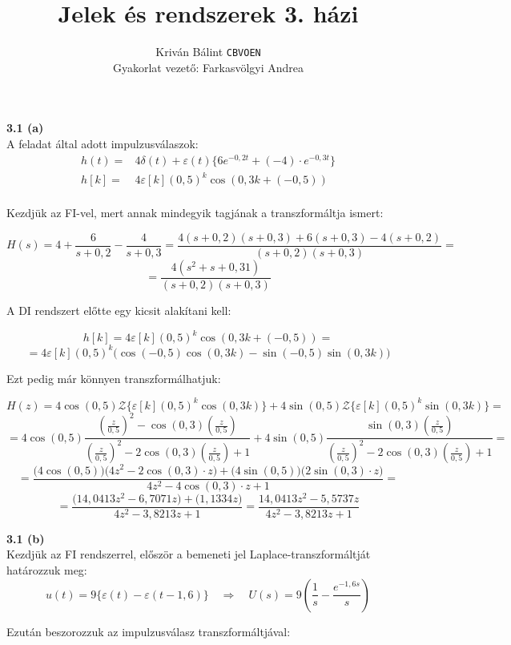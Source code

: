\documentclass[12pt,a4paper]{article}
\title{
\vspace{-2ex}
Jelek és rendszerek 3. házi}
\author{Kriván Bálint \texttt{CBVOEN}\\
Gyakorlat vezető: Farkasvölgyi Andrea}
\begin{document}
\maketitle

\thispagestyle{fancy}

\textbf{3.1 (a)}\\

A feladat által adott impulzusválaszok:
\begin{align*}
h(t) = {} & 4\delta(t) + \varepsilon(t)\{6e^{-0,2t}+(-4)\cdot e^{-0,3t}\} \\
h[k] = {} & 4\varepsilon[k](0,5)^{k}\cos(0,3k+(-0,5)) \\
\end{align*}

Kezdjük az FI-vel, mert annak mindegyik tagjának a transzformáltja ismert:

\[H(s) = 4 + \frac{6}{s+0,2} - \frac{4}{s+0,3} = \frac{4(s+0,2)(s+0,3)+6(s+0,3)-4(s+0,2)}{(s+0,2)(s+0,3)} = \]
\[= \boxed{\frac{4(s^2+s+0,31)}{(s+0,2)(s+0,3)}}\]

A DI rendszert előtte egy kicsit alakítani kell:

\[h[k] = 4\varepsilon[k](0,5)^{k}\cos(0,3k+(-0,5)) = \]
\[= 4\varepsilon[k](0,5)^{k}\Big(\cos(-0,5)\cos(0,3k) - \sin(-0,5)\sin(0,3k)\Big)\]

Ezt pedig már könnyen transzformálhatjuk:

\[H(z) = 4\cos(0,5)\mathcal{Z}\{\varepsilon[k](0,5)^{k}\cos(0,3k)\} + 4\sin(0,5)\mathcal{Z}\{\varepsilon[k](0,5)^{k}\sin(0,3k)\} = \]
\[= 4\cos(0,5)\frac{\left(\frac{z}{0,5}\right)^2 - \cos(0,3)\left(\frac{z}{0,5}\right)}{\left(\frac{z}{0,5}\right)^2-2\cos(0,3)\left(\frac{z}{0,5}\right) + 1} +
4\sin(0,5)\frac{\sin(0,3)\left(\frac{z}{0,5}\right)}{\left(\frac{z}{0,5}\right)^2-2\cos(0,3)\left(\frac{z}{0,5}\right) + 1} = \]
\[= \frac{\big(4\cos(0,5)\big)\big(4z^2 - 2\cos(0,3)\cdot z\big)+\big(4\sin(0,5)\big)\big(2\sin(0,3)\cdot z\big)}{4z^2-4\cos(0,3)\cdot z + 1} = \]
\[= \frac{\big(14,0413z^2 - 6,7071 z\big)+\big(1,1334 z\big)}{4z^2-3,8213 z + 1} = \boxed{\frac{14,0413z^2 - 5,5737 z}{4z^2-3,8213 z + 1}}\]

\textbf{3.1 (b)}\\

Kezdjük az FI rendszerrel, először a bemeneti jel Laplace-transzformáltját határozzuk meg:
\[u(t) = 9\{\varepsilon(t) - \varepsilon(t - 1,6)\} \quad \Rightarrow \quad U(s) = 9\left(\frac{1}{s}-\frac{e^{-1,6s}}{s}\right)\]

Ezután beszorozzuk az impulzusválasz transzformáltjával:
\end{document}

